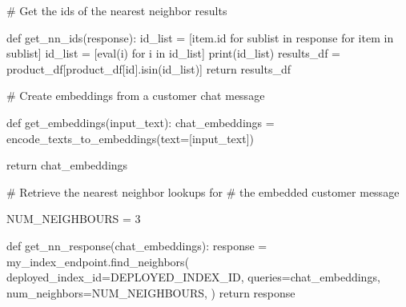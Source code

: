 \documentclass[
  letterpaper,
  DIV=11,
  numbers=noendperiod]{scrreprt}
\newenvironment{Shaded}{\begin{snugshade}}{\end{snugshade}}
\newcommand{\BuiltInTok}[1]{\textcolor[rgb]{0.00,0.23,0.31}{#1}}
\newcommand{\CommentTok}[1]{\textcolor[rgb]{0.37,0.37,0.37}{#1}}
\newcommand{\ControlFlowTok}[1]{\textcolor[rgb]{0.00,0.23,0.31}{#1}}
\newcommand{\DecValTok}[1]{\textcolor[rgb]{0.68,0.00,0.00}{#1}}
\newcommand{\KeywordTok}[1]{\textcolor[rgb]{0.00,0.23,0.31}{#1}}
\newcommand{\NormalTok}[1]{\textcolor[rgb]{0.00,0.23,0.31}{#1}}
\newcommand{\OperatorTok}[1]{\textcolor[rgb]{0.37,0.37,0.37}{#1}}
\newcommand{\StringTok}[1]{\textcolor[rgb]{0.13,0.47,0.30}{#1}}
\begin{document}
\begin{Shaded}
\begin{Highlighting}[]
\CommentTok{\# Get the ids of the nearest neighbor results}

\KeywordTok{def}\NormalTok{ get\_nn\_ids(response):}
\NormalTok{  id\_list }\OperatorTok{=}\NormalTok{ [item.}\BuiltInTok{id} \ControlFlowTok{for}\NormalTok{ sublist }\KeywordTok{in}\NormalTok{ response }\ControlFlowTok{for}\NormalTok{ item }\KeywordTok{in}\NormalTok{ sublist]}
\NormalTok{  id\_list }\OperatorTok{=}\NormalTok{ [}\BuiltInTok{eval}\NormalTok{(i) }\ControlFlowTok{for}\NormalTok{ i }\KeywordTok{in}\NormalTok{ id\_list]}
  \BuiltInTok{print}\NormalTok{(id\_list)}
\NormalTok{  results\_df }\OperatorTok{=}\NormalTok{ product\_df[product\_df[}\StringTok{\textquotesingle{}id\textquotesingle{}}\NormalTok{].isin(id\_list)]}
  \ControlFlowTok{return}\NormalTok{ results\_df}
\end{Highlighting}
\end{Shaded}

\begin{Shaded}
\begin{Highlighting}[]
\CommentTok{\# Create embeddings from a customer chat message}

\KeywordTok{def}\NormalTok{ get\_embeddings(input\_text):}
\NormalTok{  chat\_embeddings }\OperatorTok{=}\NormalTok{ encode\_texts\_to\_embeddings(text}\OperatorTok{=}\NormalTok{[input\_text])}

  \ControlFlowTok{return}\NormalTok{ chat\_embeddings}
\end{Highlighting}
\end{Shaded}

\begin{Shaded}
\begin{Highlighting}[]
\CommentTok{\# Retrieve the nearest neighbor lookups for}
\CommentTok{\# the embedded customer message}

\NormalTok{NUM\_NEIGHBOURS }\OperatorTok{=} \DecValTok{3}

\KeywordTok{def}\NormalTok{ get\_nn\_response(chat\_embeddings):}
\NormalTok{  response }\OperatorTok{=}\NormalTok{ my\_index\_endpoint.find\_neighbors(}
\NormalTok{    deployed\_index\_id}\OperatorTok{=}\NormalTok{DEPLOYED\_INDEX\_ID,}
\NormalTok{    queries}\OperatorTok{=}\NormalTok{chat\_embeddings,}
\NormalTok{    num\_neighbors}\OperatorTok{=}\NormalTok{NUM\_NEIGHBOURS,}
\NormalTok{)}
  \ControlFlowTok{return}\NormalTok{ response}
\end{Highlighting}
\end{Shaded}
\end{document}
